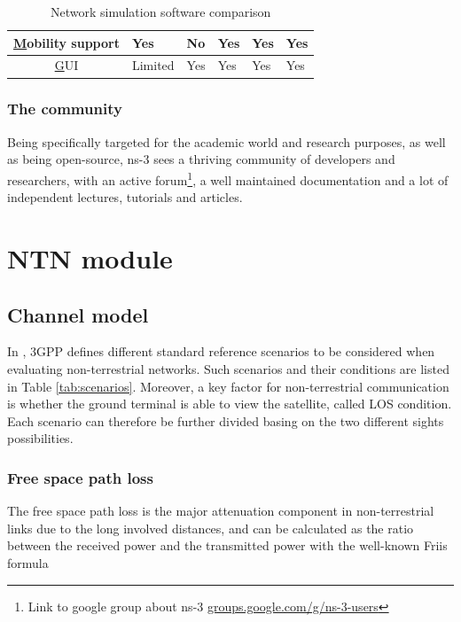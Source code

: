 \begin{table}[]
\begin{tabular}{|c|lllll}
            {\ul Mobility support} &
            Yes &
            No &
            Yes &
            Yes &
            Yes
            \\ \hline

            {\ul GUI} &
            Limited &
            Yes &
            Yes &
            Yes &
            Yes
            \\ \hline
    \end{tabular}
    \caption{Network simulation software comparison \label{tab:simulators}}
\end{table}

\subsubsection{The community}
Being specifically targeted for the academic world and research purposes, as well as being open-source, ns-3 sees a thriving community of developers and researchers, with an active forum\footnote{Link to google group about ns-3 \href{https://groups.google.com/g/ns-3-users}{groups.google.com/g/ns-3-users}}, a well maintained documentation and a lot of independent lectures, tutorials and articles. 


\section{NTN module}

\subsection{Channel model}
In \cite{3gpp-tr-38.821}, \ac{3GPP} defines different standard reference scenarios to be considered when evaluating non-terrestrial networks. Such scenarios and their conditions are listed in Table \ref{tab:scenarios}. Moreover, a key factor for non-terrestrial communication is whether the ground terminal is able to view the satellite, called \ac{LOS} condition. Each scenario can therefore be further divided basing on the two different sights possibilities.

\subsubsection{Free space path loss}
The free space path loss is the major attenuation component in non-terrestrial links due to the long involved distances, and can be calculated as the ratio between the received power and the transmitted power with the well-known Friis formula 


